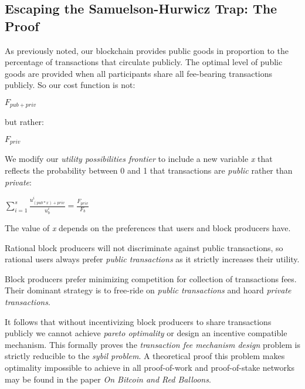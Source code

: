 \documentclass[oneside]{article}   	%
\begin{document}
\subsection*{Escaping the Samuelson-Hurwicz Trap: The Proof}

As previously noted, our blockchain provides public goods in proportion to the percentage of transactions that circulate publicly. The optimal level of public goods are provided when all participants share all fee-bearing transactions publicly. So our cost function is not:

\large
\begin{adjustwidth}{1.5em}{1.5em} 
\begin{math}
{F_{{pub}+{priv}}}
\end{math}
\end{adjustwidth}
\normalsize

but rather:

\large
\begin{adjustwidth}{1.5em}{1.5em} 
\begin{math}
{F_{{priv}}}
\end{math}
\end{adjustwidth}
\normalsize

We modify our \textit{utility possibilities frontier} to include a new variable \textit{x} that reflects the probability between 0 and 1 that transactions are \textit{public} rather than \textit{private}:

\LARGE
\begin{adjustwidth}{1.5em}{1.5em} 
\begin{math}
\sum_{i=1}^{s} \frac{u_{({pub}*{x})+{priv}}^i}{u_b^i} = \frac{F_{{priv}}}{F_b}
\end{math}
\end{adjustwidth}
\normalsize

The value of \textit{x} depends on the preferences that users and block producers have.

Rational block producers will not discriminate against public transactions, so rational users always prefer \textit{public transactions} as it strictly increases their utility.

Block producers prefer minimizing competition for collection of transactions fees. Their dominant strategy is to free-ride on \textit{public transactions} and hoard \textit{private transactions}.

It follows that without incentivizing block producers to share transactions publicly we cannot achieve \textit{pareto optimality} or design an incentive compatible mechanism. This formally proves the \textit{transaction fee mechanism design} problem is strictly reducible to the \textit{sybil problem}. A theoretical proof this problem makes optimality impossible to achieve in all proof-of-work and proof-of-stake networks may be found in the paper \textit{On Bitcoin and Red Balloons}.
\end{document}
